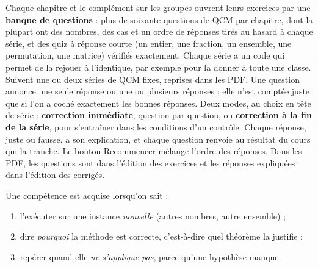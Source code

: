 \begin{methode}
Chaque chapitre et le complément sur les groupes ouvrent leurs exercices par une \textbf{banque de questions} : plus de soixante questions de QCM par chapitre, dont la plupart ont des nombres, des cas et un ordre de réponses tirés au hasard à chaque série, et des quiz à réponse courte (un entier, une fraction, un ensemble, une permutation, une matrice) vérifiés exactement. Chaque série a un code qui permet de la rejouer à l'identique, par exemple pour la donner à toute une classe. Suivent une ou deux séries de QCM fixes, reprises dans les PDF. Une question annonce \og une seule réponse \fg{} ou \og une ou plusieurs réponses \fg{} ; elle n'est comptée juste que si l'on a coché exactement les bonnes réponses. Deux modes, au choix en tête de série : \textbf{correction immédiate}, question par question, ou \textbf{correction à la fin de la série}, pour s'entraîner dans les conditions d'un contrôle. Chaque réponse, juste ou fausse, a son explication, et chaque question renvoie au résultat du cours qui la tranche. Le bouton \og Recommencer \fg{} mélange l'ordre des réponses. Dans les PDF, les questions sont dans l'édition des exercices et les réponses expliquées dans l'édition des corrigés.
\end{methode}

\begin{essentiel}
Une compétence est acquise lorsqu'on sait :
\begin{enumerate}
\item l'exécuter sur une instance \emph{nouvelle} (autres nombres, autre ensemble) ;
\item dire \emph{pourquoi} la méthode est correcte, c'est-à-dire quel théorème la justifie ;
\item repérer quand elle \emph{ne s'applique pas}, parce qu'une hypothèse manque.
\end{enumerate}
\end{essentiel}

